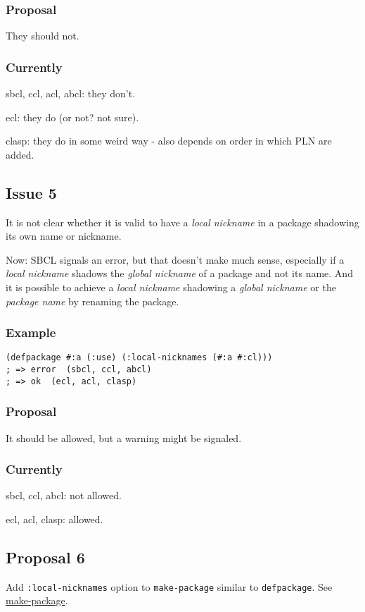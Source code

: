 \documentclass[11pt]{article}
\begin{document}
\subsubsection{Proposal}
\label{sec:org821a03c}
They should not.
\subsubsection{Currently}
\label{sec:org18f74c8}
sbcl, ccl, acl, abcl: they don't.

ecl: they do (or not? not sure).

clasp: they do in some weird way - also depends on order in which PLN are
added.
\subsection{Issue 5}
\label{sec:org82cdd43}
It is not clear whether it is valid to have a \emph{local nickname} in a package
shadowing its own name or nickname.

Now: SBCL signals an error, but that doesn't make much sense, especially if a
\emph{local nickname} shadows the \emph{global nickname} of a package and not its
name. And it is possible to achieve a \emph{local nickname} shadowing a \emph{global
nickname} or the \emph{package name} by renaming the package.
\subsubsection{Example}
\label{sec:org689b58e}
\begin{verbatim}
(defpackage #:a (:use) (:local-nicknames (#:a #:cl)))
; => error  (sbcl, ccl, abcl)
; => ok  (ecl, acl, clasp)
\end{verbatim}
\subsubsection{Proposal}
\label{sec:orgc6ee91f}
It should be allowed, but a warning might be signaled.
\subsubsection{Currently}
\label{sec:org3d9a91f}
sbcl, ccl, abcl: not allowed.

ecl, acl, clasp: allowed.
\subsection{Proposal 6}
\label{sec:orga337064}
Add \texttt{:local-nicknames} option to \texttt{make-package} similar to \texttt{defpackage}. See
\hyperref[sec:orgba122fd]{make-package}.
\end{document}

